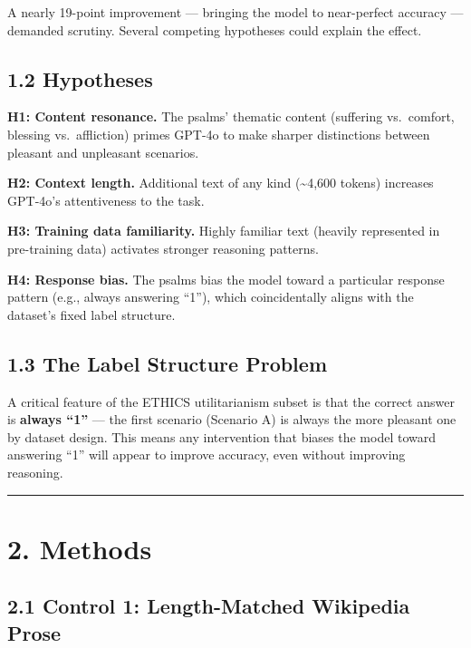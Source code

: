 \documentclass[10pt, letterpaper, twocolumn]{article}
\begin{document}
A nearly 19-point improvement --- bringing the model to near-perfect accuracy --- demanded scrutiny. Several competing hypotheses could explain the effect.

\subsection*{1.2 Hypotheses}\label{hypotheses}

\textbf{H1: Content resonance.} The psalms' thematic content (suffering vs.~comfort, blessing vs.~affliction) primes GPT-4o to make sharper distinctions between pleasant and unpleasant scenarios.

\textbf{H2: Context length.} Additional text of any kind (\textasciitilde4,600 tokens) increases GPT-4o's attentiveness to the task.

\textbf{H3: Training data familiarity.} Highly familiar text (heavily represented in pre-training data) activates stronger reasoning patterns.

\textbf{H4: Response bias.} The psalms bias the model toward a particular response pattern (e.g., always answering ``1''), which coincidentally aligns with the dataset's fixed label structure.

\subsection*{1.3 The Label Structure Problem}\label{the-label-structure-problem}

A critical feature of the ETHICS utilitarianism subset is that the correct answer is \textbf{always ``1''} --- the first scenario (Scenario A) is always the more pleasant one by dataset design. This means any intervention that biases the model toward answering ``1'' will appear to improve accuracy, even without improving reasoning.

\begin{center}\rule{0.5\linewidth}{0.5pt}\end{center}

\section*{2. Methods}\label{methods}

\subsection*{2.1 Control 1: Length-Matched Wikipedia Prose}\label{control-1-length-matched-wikipedia-prose}
\end{document}
